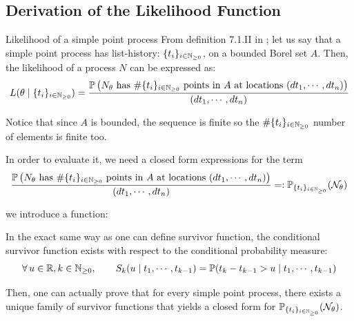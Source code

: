 \subsection{Derivation of the Likelihood Function}
\begin{theoreme}{Likelihood of a simple point process}
From definition 7.1.II in \cite{daley}; let us say that a simple point process has list-history: $\{  t_i  \}_{ i \in \mathbb{N}_{\geq 0}}$, on a bounded Borel set $A$. Then, the likelihood of a process $N$ can be expressed as:
\begin{equation}
L( \theta \mid \{ t_i \}_{ i \in \mathbb{N}_{\geq 0}} ) =  \frac{\mathbb P \left (N_{\theta}  \text{ has } \# \{ t_i \}_{ i \in \mathbb{N}_{\geq 0}} \text{ points in } A \text{ at locations  } (d t_1, \cdots, d t_n) \right ) } {(d t_1, \cdots, d t_n)}
\end{equation}

Notice that since $A$ is bounded, the sequence is finite so the $\#\{ t_i \}_{ i \in \mathbb{N}_{\geq 0}}$ number of elements is finite too. 
\end{theoreme}




In order to evaluate it, we need a closed form expressions for the term $$\frac{\mathbb P \left (N_{\theta}  \text{ has } \# \{ t_i \}_{ i \in \mathbb{N}_{\geq 0}} \text{ points in } A \text{ at locations  } (d t_1, \cdots, d t_n) \right ) } {(d t_1, \cdots, d t_n)}  =: \mathbb P_{\{ t_i \}_{ i \in \mathbb{N}_{\geq 0}}} ( \mathcal N_{\theta} ) $$

we introduce a function:
\begin{definition}
\label{def:conditional_survivor_functions}
In the exact same way as one can define survivor function, the conditional survivor function exists with respect to the conditional probability measure:
\begin{equation}
\forall u \in \R, k \in \N, \qquad S_k ( u \mid t_1, \cdots, t_{k-1} ) = \mathbb P ( t_k - t_{k-1} > u \mid t_1, \cdots, t_{k-1} ) 
\end{equation}
\end{definition}



Then, one can actually prove that for every simple point process, there exists a unique family of survivor functions that yields a closed form for $\mathbb P_{\{ t_i \}_{ i \in \mathbb{N}_{\geq 0}}} ( \mathcal N_{\theta} )$.

